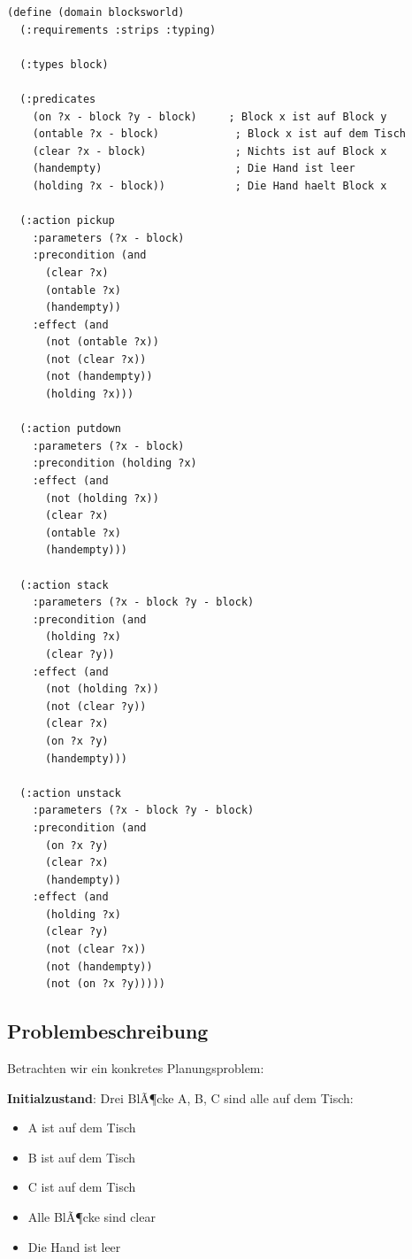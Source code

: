 ﻿\documentclass[a4paper,12pt]{article}
\theoremstyle{definition}
\begin{document}
\begin{lstlisting}[language=PDDL, caption=Blocksworld DomÃ¤ne]
(define (domain blocksworld)
  (:requirements :strips :typing)
  
  (:types block)
  
  (:predicates
    (on ?x - block ?y - block)     ; Block x ist auf Block y
    (ontable ?x - block)            ; Block x ist auf dem Tisch
    (clear ?x - block)              ; Nichts ist auf Block x
    (handempty)                     ; Die Hand ist leer
    (holding ?x - block))           ; Die Hand haelt Block x
  
  (:action pickup
    :parameters (?x - block)
    :precondition (and
      (clear ?x)
      (ontable ?x)
      (handempty))
    :effect (and
      (not (ontable ?x))
      (not (clear ?x))
      (not (handempty))
      (holding ?x)))
  
  (:action putdown
    :parameters (?x - block)
    :precondition (holding ?x)
    :effect (and
      (not (holding ?x))
      (clear ?x)
      (ontable ?x)
      (handempty)))
  
  (:action stack
    :parameters (?x - block ?y - block)
    :precondition (and
      (holding ?x)
      (clear ?y))
    :effect (and
      (not (holding ?x))
      (not (clear ?y))
      (clear ?x)
      (on ?x ?y)
      (handempty)))
  
  (:action unstack
    :parameters (?x - block ?y - block)
    :precondition (and
      (on ?x ?y)
      (clear ?x)
      (handempty))
    :effect (and
      (holding ?x)
      (clear ?y)
      (not (clear ?x))
      (not (handempty))
      (not (on ?x ?y)))))
\end{lstlisting}

\subsection{Problembeschreibung}

Betrachten wir ein konkretes Planungsproblem:

\textbf{Initialzustand}: Drei BlÃ¶cke A, B, C sind alle auf dem Tisch:
\begin{itemize}
	\item[-] A ist auf dem Tisch
	\item[-] B ist auf dem Tisch
	\item[-] C ist auf dem Tisch
	\item[-] Alle BlÃ¶cke sind clear
	\item[-] Die Hand ist leer
\end{itemize}
\end{document}
